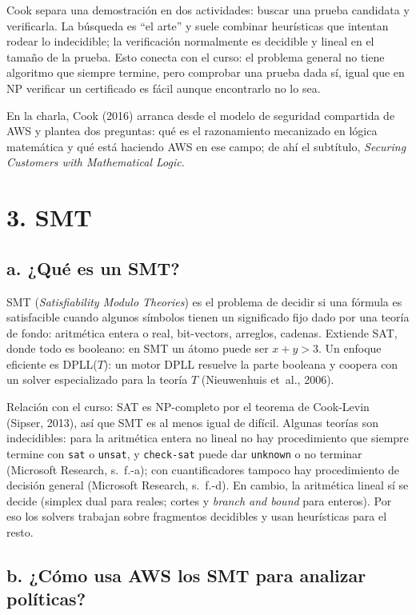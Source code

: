 \documentclass[11pt,letterpaper]{article}
\begin{document}
Cook separa una demostración en dos actividades: buscar una prueba candidata y verificarla. La búsqueda es ``el arte'' y suele combinar heurísticas que intentan rodear lo indecidible; la verificación normalmente es decidible y lineal en el tamaño de la prueba. Esto conecta con el curso: el problema general no tiene algoritmo que siempre termine, pero comprobar una prueba dada sí, igual que en NP verificar un certificado es fácil aunque encontrarlo no lo sea.

En la charla, Cook (2016) arranca desde el modelo de seguridad compartida de AWS y plantea dos preguntas: qué es el razonamiento mecanizado en lógica matemática y qué está haciendo AWS en ese campo; de ahí el subtítulo, \emph{Securing Customers with Mathematical Logic}.

\section*{3. SMT}

\subsection*{a. ¿Qué es un SMT?}

SMT (\emph{Satisfiability Modulo Theories}) es el problema de decidir si una fórmula es satisfacible cuando algunos símbolos tienen un significado fijo dado por una teoría de fondo: aritmética entera o real, bit-vectors, arreglos, cadenas. Extiende SAT, donde todo es booleano: en SMT un átomo puede ser $x + y > 3$. Un enfoque eficiente es DPLL($T$): un motor DPLL resuelve la parte booleana y coopera con un solver especializado para la teoría $T$ (Nieuwenhuis et~al., 2006).

Relación con el curso: SAT es NP-completo por el teorema de Cook-Levin (Sipser, 2013), así que SMT es al menos igual de difícil. Algunas teorías son indecidibles: para la aritmética entera no lineal no hay procedimiento que siempre termine con \texttt{sat} o \texttt{unsat}, y \texttt{check-sat} puede dar \texttt{unknown} o no terminar (Microsoft Research, s.~f.-a); con cuantificadores tampoco hay procedimiento de decisión general (Microsoft Research, s.~f.-d). En cambio, la aritmética lineal sí se decide (simplex dual para reales; cortes y \emph{branch and bound} para enteros). Por eso los solvers trabajan sobre fragmentos decidibles y usan heurísticas para el resto.

\subsection*{b. ¿Cómo usa AWS los SMT para analizar políticas?}
\end{document}

